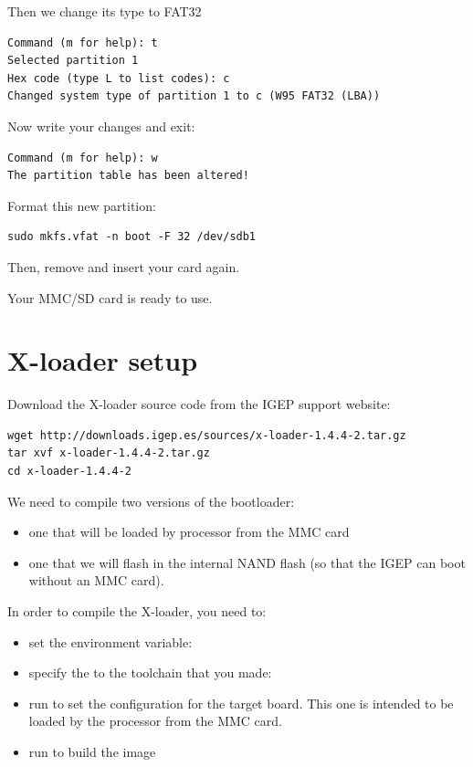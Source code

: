 Then we change its type to FAT32

\begin{verbatim}
Command (m for help): t
Selected partition 1
Hex code (type L to list codes): c
Changed system type of partition 1 to c (W95 FAT32 (LBA))
\end{verbatim}

Now write your changes and exit: 

\begin{verbatim}
Command (m for help): w 
The partition table has been altered! 
\end{verbatim}

Format this new partition:

\begin{verbatim}
sudo mkfs.vfat -n boot -F 32 /dev/sdb1
\end{verbatim}

Then, remove and insert your card again.

Your MMC/SD card is ready to use.

\section{X-loader setup}

Download the X-loader source code from the IGEP support website:

\begin{verbatim}
wget http://downloads.igep.es/sources/x-loader-1.4.4-2.tar.gz
tar xvf x-loader-1.4.4-2.tar.gz
cd x-loader-1.4.4-2
\end{verbatim}

We need to compile two versions of the bootloader:
\begin{itemize}
\item one that will be loaded by processor from the MMC card
\item one that we will flash in the internal NAND flash (so that the IGEP can boot without an MMC card).
\end{itemize}

In order to compile the X-loader, you need to:

\begin{itemize}

\item set the  environment variable:\\

\item specify the  to the toolchain that you made:\\

\item run  to set the configuration
  for the target board. This one is intended to be loaded by the
  processor from the MMC card.

\item run  to build the image

\end{itemize}

